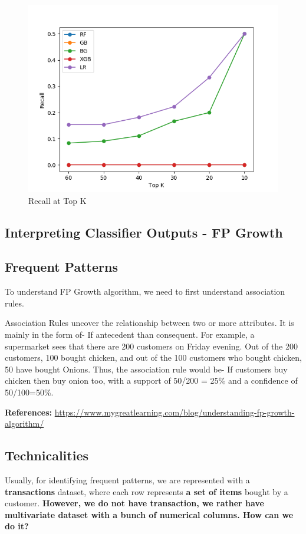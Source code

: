 \documentclass{article}
\begin{document}
\begin{figure}[H]
\centering
\includegraphics[scale=0.5]{plots/toydata/recallstopK.png}
\caption{Recall at Top K}
\label{Fig:prectopk}
\end{figure}

\subsection{Interpreting Classifier Outputs - FP Growth}
\subsection*{Frequent Patterns}
To understand FP Growth algorithm, we need to first understand association rules.

Association Rules uncover the relationship between two or more attributes. It is mainly in the form of- If antecedent than consequent.  For example, a supermarket sees that there are 200 customers on Friday evening. Out of the 200 customers, 100 bought chicken, and out of the 100 customers who bought chicken, 50 have bought Onions. Thus, the association rule would be- If customers buy chicken then buy onion too, with a support of 50/200 = 25\% and a confidence of 50/100=50\%.

\textbf{References:} \url{https://www.mygreatlearning.com/blog/understanding-fp-growth-algorithm/}

\subsection{Technicalities}
\noindent Usually, for identifying frequent patterns, we are represented with a \textbf{transactions} dataset, where each row represents \textbf{a set of items} bought by a customer. \textbf{However, we do not have transaction, we rather have multivariate dataset with a bunch of numerical columns. How can we do it?}
\end{document}
